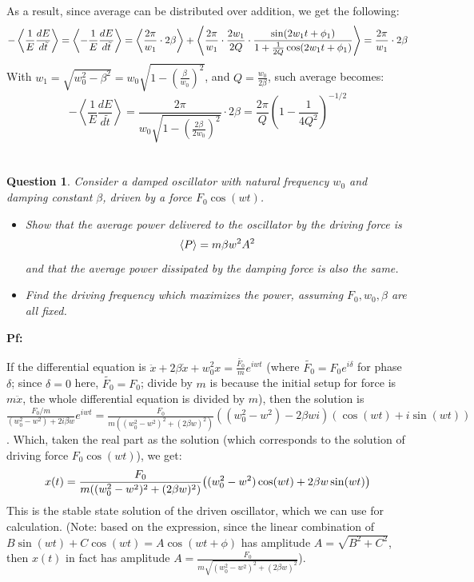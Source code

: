 \documentclass{article}
\newtheorem{question}{Question}
\DeclarePairedDelimiter{\paran}{(}{)}%
\DeclarePairedDelimiter{\bracket}{\langle}{\rangle}
\begin{document}
As a result, since average can be distributed over addition, we get the following:
\begin{equation}
    -\left<\frac{1}{E}\frac{dE}{d\tilde{t}}\right>=\left<-\frac{1}{E}\frac{dE}{d\tilde{t}}\right> = \bracket*{\frac{2\pi}{w_1}\cdot 2\beta}+\bracket*{\frac{2\pi}{w_1}\cdot \frac{2w_1}{2Q}\cdot\frac{\sin(2w_1t+\phi_1)}{1+\frac{1}{2Q}\cos(2w_1t+\phi_1)}} = \frac{2\pi}{w_1}\cdot 2\beta
\end{equation}
With $w_1 = \sqrt{w_0^2-\beta^2} = w_0\sqrt{1-\left(\frac{\beta}{w_0}\right)^2}$, and $Q=\frac{w_0}{2\beta}$, such average becomes:
\begin{equation}
    -\left<\frac{1}{E}\frac{dE}{d\tilde{t}}\right> = \frac{2\pi}{w_0\sqrt{1-\left(\frac{2\beta}{2w_0}\right)^2}}\cdot 2\beta  = \frac{2\pi}{Q}\left(1-\frac{1}{4Q^2}\right)^{-1/2}
\end{equation}

\break

\section{}
\begin{question}\label{q3}
    Consider a damped oscillator with natural frequency $w_0$ and damping constant $\beta$, driven by a force $F_0\cos(wt)$.
    \begin{itemize}
        \item[(a)] Show that the average power delivered to the oscillator by the driving force is 
        $$\bracket*{P}=m\beta w^2A^2$$
        and that the average power dissipated by the damping force is also the same.
        \item[(b)] Find the driving frequency which maximizes the power, assuming $F_0, w_0, \beta$ are all fixed.
    \end{itemize}
\end{question}

\textbf{Pf:}

If the differential equation is $\ddot x+2\beta \dot x + w_0^2x = \frac{\tilde{F_0}}{m}e^{iwt}$ (where $\tilde{F_0}=F_0e^{i\delta}$ for phase $\delta$; since $\delta=0$ here, $\tilde{F_0}=F_0$; divide by $m$ is because the initial setup for force is $m\ddot x$, the whole differential equation is divided by $m$), then the solution is $\frac{F_0/m}{(w_0^2-w^2)+2i\beta w}e^{iwt} = \frac{F_0}{m((w_0^2-w^2)^2+(2\beta w)^2)}((w_0^2-w^2)-2\beta wi)(\cos(wt)+i\sin(wt))$. Which, taken the real part as the solution (which corresponds to the solution of driving force $F_0\cos(wt)$), we get:
\begin{equation}
    x(t) = \frac{F_0}{m((w_0^2-w^2)^2+(2\beta w)^2)}\paran*{(w_0^2-w^2)\cos(wt)+2\beta w\sin(wt)}
\end{equation}
This is the stable state solution of the driven oscillator, which we can use for calculation. (Note: based on the expression, since the linear combination of $B\sin(wt)+C\cos(wt)=A\cos(wt+\phi)$ has amplitude $A=\sqrt{B^2+C^2}$, then $x(t)$ in fact has amplitude $A=\frac{F_0}{m\sqrt{(w_0^2-w^2)^2+(2\beta w)^2}}$).
\end{document}
